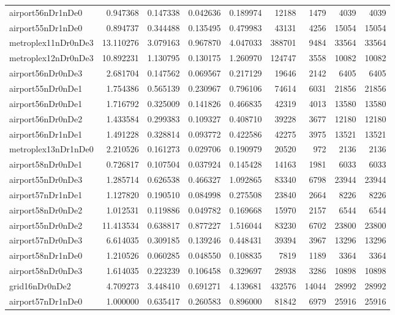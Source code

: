 \documentclass[../../../thesis.tex]{subfiles}
\begin{document}
\begin{longtable}{|l|r|r|r|r|r|r|r|r|}
airport56nDr1nDe0 & 0.947368 & 0.147338 & 0.042636 & 0.189974 & 12188 & 1479 & 4039 & 4039 \\
airport55nDr1nDe0 & 0.894737 & 0.344488 & 0.135495 & 0.479983 & 43131 & 4256 & 15054 & 15054 \\
metroplex11nDr0nDe3 & 13.110276 & 3.079163 & 0.967870 & 4.047033 & 388701 & 9484 & 33564 & 33564 \\
metroplex12nDr0nDe3 & 10.892231 & 1.130795 & 0.130175 & 1.260970 & 124747 & 3558 & 10082 & 10082 \\
airport56nDr0nDe3 & 2.681704 & 0.147562 & 0.069567 & 0.217129 & 19646 & 2142 & 6405 & 6405 \\
airport55nDr0nDe1 & 1.754386 & 0.565139 & 0.230967 & 0.796106 & 74614 & 6031 & 21856 & 21856 \\
airport56nDr0nDe1 & 1.716792 & 0.325009 & 0.141826 & 0.466835 & 42319 & 4013 & 13580 & 13580 \\
airport56nDr0nDe2 & 1.433584 & 0.299383 & 0.109327 & 0.408710 & 39228 & 3677 & 12180 & 12180 \\
airport56nDr1nDe1 & 1.491228 & 0.328814 & 0.093772 & 0.422586 & 42275 & 3975 & 13521 & 13521 \\
metroplex13nDr1nDe0 & 2.210526 & 0.161273 & 0.029706 & 0.190979 & 20520 & 972 & 2136 & 2136 \\
airport58nDr0nDe1 & 0.726817 & 0.107504 & 0.037924 & 0.145428 & 14163 & 1981 & 6033 & 6033 \\
airport55nDr0nDe3 & 1.285714 & 0.626538 & 0.466327 & 1.092865 & 83340 & 6798 & 23944 & 23944 \\
airport57nDr1nDe1 & 1.127820 & 0.190510 & 0.084998 & 0.275508 & 23840 & 2664 & 8226 & 8226 \\
airport58nDr0nDe2 & 1.012531 & 0.119886 & 0.049782 & 0.169668 & 15970 & 2157 & 6544 & 6544 \\
airport55nDr0nDe2 & 11.413534 & 0.638817 & 0.877227 & 1.516044 & 83230 & 6702 & 23800 & 23800 \\
airport57nDr0nDe3 & 6.614035 & 0.309185 & 0.139246 & 0.448431 & 39394 & 3967 & 13296 & 13296 \\
airport58nDr1nDe0 & 1.210526 & 0.060285 & 0.048550 & 0.108835 & 7819 & 1189 & 3364 & 3364 \\
airport58nDr0nDe3 & 1.614035 & 0.223239 & 0.106458 & 0.329697 & 28938 & 3286 & 10898 & 10898 \\
grid16nDr0nDe2 & 4.709273 & 3.448410 & 0.691271 & 4.139681 & 432576 & 14044 & 28992 & 28992 \\
airport57nDr1nDe0 & 1.000000 & 0.635417 & 0.260583 & 0.896000 & 81842 & 6979 & 25916 & 25916 \\

\end{longtable}
\end{document}

